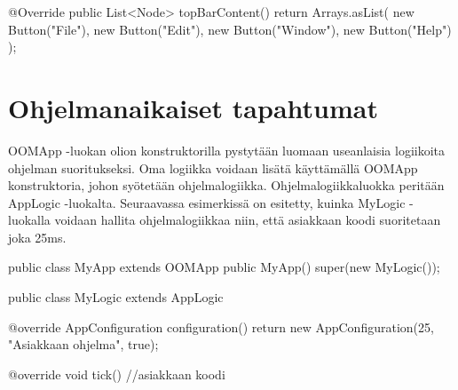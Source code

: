 \begin{javacode}
@Override
public List<Node> topBarContent() {
	return Arrays.asList(
		new Button("File"),
		new Button("Edit"),
		new Button("Window"),
		new Button("Help")
	);
}
\end{javacode}

\section{Ohjelmanaikaiset tapahtumat}

\label{D}

OOMApp -luokan olion konstruktorilla pystytään luomaan useanlaisia logiikoita
ohjelman suoritukseksi. Oma logiikka voidaan lisätä käyttämällä OOMApp
konstruktoria, johon syötetään ohjelmalogiikka. Ohjelmalogiikkaluokka peritään
AppLogic -luokalta. Seuraavassa esimerkissä on esitetty, kuinka MyLogic
-luokalla voidaan hallita ohjelmalogiikkaa niin, että asiakkaan koodi
suoritetaan joka 25ms.

\begin{javacode}
public class MyApp extends OOMApp {
	public MyApp() {
		super(new MyLogic());
	}
}

public class MyLogic extends AppLogic {
	@override
	AppConfiguration configuration() {
		return new AppConfiguration(25, "Asiakkaan ohjelma", true);
	}
    
	@override
	void tick() {
		//asiakkaan koodi
	}
}
\end{javacode}
